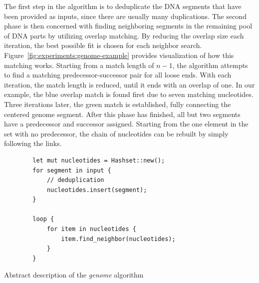 The first step in the algorithm is to deduplicate the DNA segments that have been provided as inputs, since there are usually many duplications.
The second phase is then concerned with finding neighboring segments in the remaining pool of DNA parts by utilizing overlap matching.
By reducing the overlap size each iteration, the best possible fit is chosen for each neighbor search.
Figure~\ref{fig:experiments:genome-example} provides visualization of how this matching works.
Starting from a match length of $n-1$, the algorithm attempts to find a matching predecessor-successor pair for all loose ends.
With each iteration, the match length is reduced, until it ends with an overlap of one.
In our example, the blue overlap match is found first due to seven matching nucleotides.
Three iterations later, the green match is established, fully connecting the centered genome segment.
After this phase has finished, all but two segments have a predecessor and successor assigned.
Starting from the one element in the set with no predecessor, the chain of nucleotides can be rebuilt by simply following the links.

\begin{listing}
    \begin{verbatim}
        let mut nucleotides = Hashset::new();
        for segment in input {
            // deduplication
            nucleotides.insert(segment);
        }

        loop {
            for item in nucleotides {
                item.find_neighbor(nucleotides);
            }
        }
    \end{verbatim}
    \caption{Abstract description of the \emph{genome} algorithm}
    \label{fig:experiments:opportunities:algos:genome}
\end{listing}

